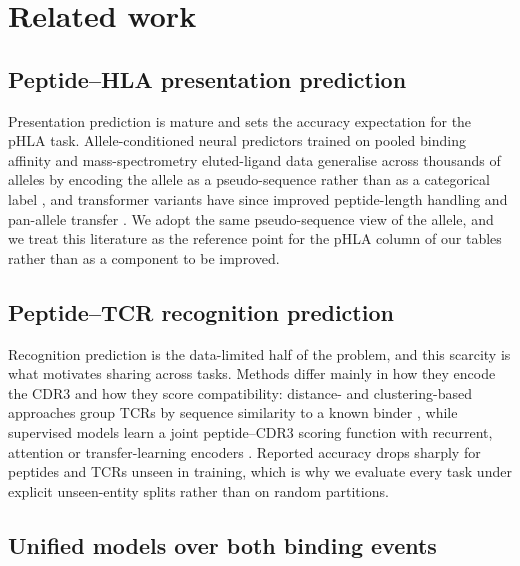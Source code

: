 \documentclass[webpdf,modern,large,namedate]{oup-authoring-template}
\theoremstyle{thmstyleone}
\theoremstyle{thmstyletwo}
\theoremstyle{thmstylethree}
\newcommand{\PH}{pHLA}
\begin{document}
\section{Related work}\label{sec:related}

\subsection{Peptide--HLA presentation prediction}\label{sec:related:ph}

Presentation prediction is mature and sets the accuracy expectation for the
\PH{} task. Allele-conditioned neural predictors trained on pooled binding
affinity and mass-spectrometry eluted-ligand data generalise across thousands
of alleles by encoding the allele as a pseudo-sequence rather than as a
categorical label \citep{reynisson2020netmhcpan, odonnell2020mhcflurry}, and
transformer variants have since improved peptide-length handling and
pan-allele transfer \citep{chu2022transphla}. We adopt the same
pseudo-sequence view of the allele, and we treat this literature as the
reference point for the \PH{} column of our tables rather than as a component
to be improved.

\subsection{Peptide--TCR recognition prediction}\label{sec:related:pt}

Recognition prediction is the data-limited half of the problem, and this
scarcity is what motivates sharing across tasks. Methods differ mainly in how
they encode the CDR3 and how they score compatibility: distance- and
clustering-based approaches group TCRs by sequence similarity to a known
binder \citep{glanville2017identifying, dash2017quantifiable}, while supervised
models learn a joint peptide--CDR3 scoring function with recurrent, attention or
transfer-learning encoders \citep{springer2020ergo, lu2021pmtnet,
weber2021titan}. Reported accuracy drops sharply for peptides and TCRs unseen
in training, which is why we evaluate every task under explicit unseen-entity
splits rather than on random partitions.

\subsection{Unified models over both binding events}\label{sec:related:unified}
\end{document}
